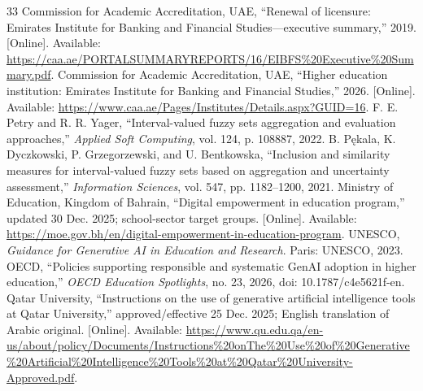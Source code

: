 \documentclass[conference,letterpaper]{IEEEtran}
\begin{document}
\begin{thebibliography}{33}
 Commission for Academic Accreditation, UAE, ``Renewal of licensure: Emirates Institute for Banking and Financial Studies---executive summary,'' 2019. [Online]. Available: \url{https://caa.ae/PORTALSUMMARYREPORTS/16/EIBFS%20Executive%20Summary.pdf}.
 Commission for Academic Accreditation, UAE, ``Higher education institution: Emirates Institute for Banking and Financial Studies,'' 2026. [Online]. Available: \url{https://www.caa.ae/Pages/Institutes/Details.aspx?GUID=16}.
 F. E. Petry and R. R. Yager, ``Interval-valued fuzzy sets aggregation and evaluation approaches,'' \emph{Applied Soft Computing}, vol. 124, p. 108887, 2022.
 B. P\k{e}kala, K. Dyczkowski, P. Grzegorzewski, and U. Bentkowska, ``Inclusion and similarity measures for interval-valued fuzzy sets based on aggregation and uncertainty assessment,'' \emph{Information Sciences}, vol. 547, pp. 1182--1200, 2021.
 Ministry of Education, Kingdom of Bahrain, ``Digital empowerment in education program,'' updated 30 Dec. 2025; school-sector target groups. [Online]. Available: \url{https://moe.gov.bh/en/digital-empowerment-in-education-program}.
 UNESCO, \emph{Guidance for Generative AI in Education and Research}. Paris: UNESCO, 2023.
 OECD, ``Policies supporting responsible and systematic GenAI adoption in higher education,'' \emph{OECD Education Spotlights}, no. 23, 2026, doi: 10.1787/c4e5621f-en.
 Qatar University, ``Instructions on the use of generative artificial intelligence tools at Qatar University,'' approved/effective 25 Dec. 2025; English translation of Arabic original. [Online]. Available: \url{https://www.qu.edu.qa/en-us/about/policy/Documents/Instructions%20onThe%20Use%20of%20Generative%20Artificial%20Intelligence%20Tools%20at%20Qatar%20University-Approved.pdf}.


\end{thebibliography}
\end{document}
